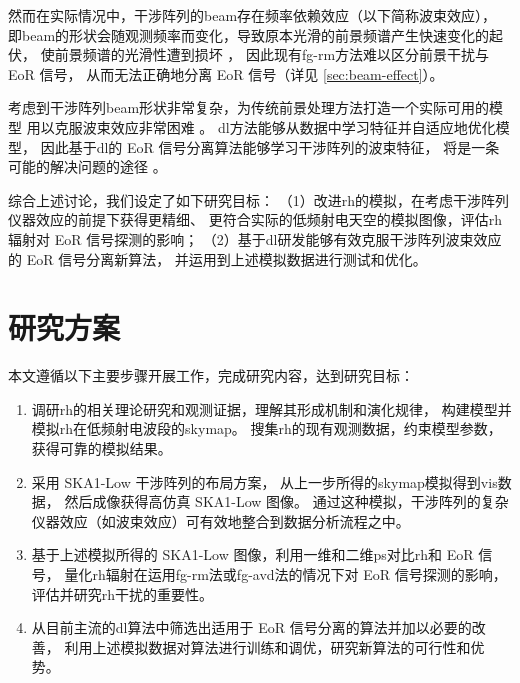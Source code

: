 \begin{itemize}
\hspace{2\ccwd}%
然而在实际情况中，干涉阵列的\ac{beam}存在频率依赖效应（以下简称波束效应），
即\ac{beam}的形状会随观测频率而变化，导致原本光滑的前景频谱产生快速变化的起伏，
使前景频谱的光滑性遭到损坏 \cite{liu2009ps}，
因此现有\ac{fg-rm}方法难以区分前景干扰与 EoR 信号，
从而无法正确地分离 EoR 信号（详见 \autoref{sec:beam-effect}）。

\hspace{2\ccwd}%
考虑到干涉阵列\ac{beam}形状非常复杂，为传统前景处理方法打造一个实际可用的模型
用以克服波束效应非常困难 \cite{lochner2015}。
\ac{dl}方法能够从数据中学习特征并自适应地优化模型，
因此基于\ac{dl}的 EoR 信号分离算法能够学习干涉阵列的波束特征，
将是一条可能的解决问题的途径 \cite{herbel2018,vafaeiSadr2019}。

\end{itemize}

综合上述讨论，我们设定了如下研究目标：
（1）改进\ac{rh}的模拟，在考虑干涉阵列仪器效应的前提下获得更精细、
更符合实际的低频射电天空的模拟图像，评估\ac{rh}辐射对 EoR 信号探测的影响；
（2）基于\ac{dl}研发能够有效克服干涉阵列波束效应的 EoR 信号分离新算法，
并运用到上述模拟数据进行测试和优化。


\section{研究方案}

本文遵循以下主要步骤开展工作，完成研究内容，达到研究目标：
\begin{enumerate}
\item
调研\ac{rh}的相关理论研究和观测证据，理解其形成机制和演化规律，
构建模型并模拟\ac{rh}在低频射电波段的\ac{skymap}。
搜集\ac{rh}的现有观测数据，约束模型参数，获得可靠的模拟结果。

\item
采用 SKA1-Low 干涉阵列的布局方案，
从上一步所得的\ac{skymap}模拟得到\ac{vis}数据，
然后成像获得高仿真 SKA1-Low 图像。
通过这种模拟，干涉阵列的复杂仪器效应（如波束效应）可有效地整合到数据分析流程之中。

\item
基于上述模拟所得的 SKA1-Low 图像，利用一维和二维\ac{ps}对比\ac{rh}和 EoR 信号，
量化\ac{rh}辐射在运用\ac{fg-rm}法或\ac{fg-avd}法的情况下对 EoR 信号探测的影响，
评估并研究\ac{rh}干扰的重要性。

\item
从目前主流的\ac{dl}算法中筛选出适用于 EoR 信号分离的算法并加以必要的改善，
利用上述模拟数据对算法进行训练和调优，研究新算法的可行性和优势。

\end{enumerate}


